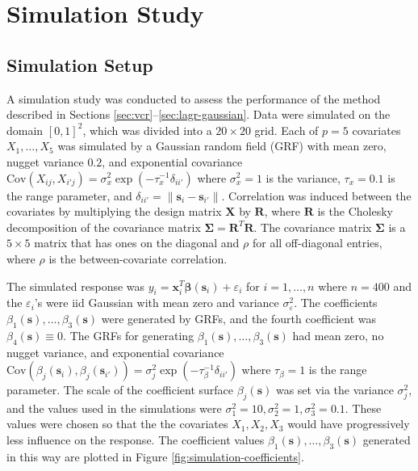 \documentclass[authoryear,review, 12pt]{elsarticle}
\begin{document}
\section{Simulation Study\label{sec:simulations}}

\subsection{Simulation Setup}

A simulation study was conducted to assess the performance of the
method described in Sections \ref{sec:vcr}--\ref{sec:lagr-gaussian}.
Data were simulated on the domain $[0,1]^{2}$, which was divided
into a $20\times20$ grid. Each of $p=5$ covariates $X_{1},\dots,X_{5}$
was simulated by a Gaussian random field (GRF) with mean zero, nugget variance $0.2$, and exponential
covariance $\text{Cov}\left(X_{ij},X_{i'j}\right)=\sigma_{x}^{2}\exp\left(-\tau_{x}^{-1}\delta_{ii'}\right)$
where $\sigma_{x}^{2}=1$ is the variance, $\tau_{x}=0.1$ is the
range parameter, and $\delta_{ii'}=\|\bm{s}_{i}-\bm{s}_{i'}\|$. Correlation
was induced between the covariates by multiplying the design matrix
$\bm{X}$ by $\bm{R}$, where $\bm{R}$ is the Cholesky decomposition
of the covariance matrix $\bm{\Sigma}=\bm{R}^{T}\bm{R}$. The covariance
matrix $\bm{\Sigma}$ is a $5\times5$ matrix that has ones on the
diagonal and $\rho$ for all off-diagonal entries, where $\rho$ is
the between-covariate correlation. 

The simulated response was $y_{i}=\bm{x}_{i}^{T}\bm{\beta}(\bm{s}_{i})+\varepsilon_{i}$
for $i=1,\dots,n$ where $n=400$ and the $\varepsilon_{i}$'s were
iid Gaussian with mean zero and variance $\sigma_{\varepsilon}^{2}$.
The coefficients $\beta_1(\bm{s}), \dots, \beta_3(\bm{s})$ were generated by GRFs, and the fourth coefficient was $\beta_4(\bm{s}) \equiv 0$.
The GRFs for generating $\beta_1(\bm{s}), \dots, \beta_3(\bm{s})$ had mean zero, no nugget variance, and exponential
covariance $\text{Cov}\left(\beta_j(\bm{s}_i), \beta_j(\bm{s}_{i'})\right)=\sigma_j^2 \exp\left(-\tau_{\beta}^{-1}\delta_{ii'}\right)$
where $\tau_{\beta}=1$ is the range parameter. The scale of the coefficient surface $\beta_j(\bm{s})$ was set via the variance $\sigma_j^2$, and the values used in the simulations were $\sigma_1^2 = 10, \sigma_2^2=1, \sigma_3^2=0.1$.
These values were chosen so that the the covariates $X_1, X_2, X_3$ would have progressively less influence on the response.
The coefficient values $\beta_1(\bm{s}), \dots, \beta_3(\bm{s})$ generated in this way are plotted in Figure \ref{fig:simulation-coefficients}.
\end{document}
